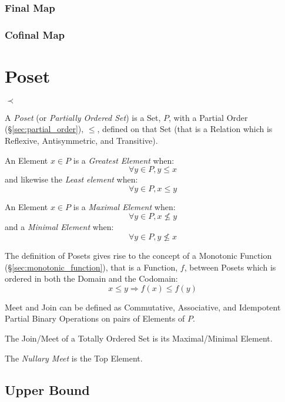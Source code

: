 \subsubsection{Final Map}\label{sec:final_map}

\subsubsection{Cofinal Map}\label{sec:cofinal_map}



\section{Poset}\label{sec:poset}

$\prec$

A \emph{Poset} (or \emph{Partially Ordered Set}) is a Set, $P$, with a
Partial Order (\S\ref{sec:partial_order}), $\leq$, defined on that
Set (that is a Relation which is Reflexive, Antisymmetric, and
Transitive).

An Element $x \in P$ is a \emph{Greatest Element} when:
\[
  \forall y \in P, y \leq x
\]
and likewise the \emph{Least element} when:
\[
  \forall y \in P, x \leq y
\]

An Element $x \in P$ is a \emph{Maximal Element} when:
\[
  \forall y \in P, x \nleq y
\]
and a \emph{Minimal Element} when:
\[
  \forall y \in P, y \nleq x
\]

The definition of Posets gives rise to the concept of a Monotonic
Function (\S\ref{sec:monotonic_function}), that is a Function, $f$,
between Posets which is ordered in both the Domain and the Codomain:
\[
  x \leq y \Rightarrow f(x) \leq f(y)
\]


Meet and Join can be defined as Commutative, Associative, and
Idempotent Partial Binary Operations on pairs of Elements of $P$.

The Join/Meet of a Totally Ordered Set is its Maximal/Minimal Element.

The \emph{Nullary Meet} is the Top Element.



\subsection{Upper Bound}\label{sec:upper_bound}

